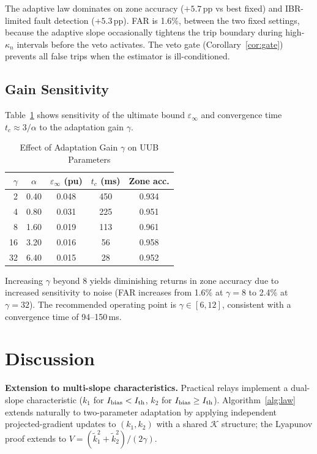 \documentclass[journal]{IEEEtran}
\newcommand{\kappan}{\kappa_{n}}
\newcommand{\ktilde}{\tilde{k}}
\newcommand{\Ibias}{I_{\rm bias}}
\newcommand{\calK}{\mathcal{K}}
\begin{document}
The adaptive law dominates on zone accuracy ($+5.7$\,pp vs best fixed)
and IBR-limited fault detection ($+5.3$\,pp).  FAR is 1.6\%, between
the two fixed settings, because the adaptive slope occasionally tightens
the trip boundary during high-$\kappan$ intervals before the veto
activates.  The veto gate (Corollary~\ref{cor:gate}) prevents all
false trips when the estimator is ill-conditioned.

\subsection{Gain Sensitivity}

Table~\ref{tab:gamma} shows sensitivity of the ultimate bound
$\varepsilon_\infty$ and convergence time $t_c \approx 3/\alpha$
to the adaptation gain $\gamma$.

\begin{table}[!t]
  \caption{Effect of Adaptation Gain $\gamma$ on UUB Parameters}
  \label{tab:gamma}
  \centering\small
  \begin{tabular}{@{}rcccc@{}}
    \toprule
    $\gamma$ & $\alpha$ & $\varepsilon_\infty$ (pu) & $t_c$ (ms) & Zone acc. \\
    \midrule
    2  & 0.40 & 0.048 & 450 & 0.934 \\
    4  & 0.80 & 0.031 & 225 & 0.951 \\
    8  & 1.60 & 0.019 & 113 & 0.961 \\
    16 & 3.20 & 0.016 &  56 & 0.958 \\
    32 & 6.40 & 0.015 &  28 & 0.952 \\
    \bottomrule
  \end{tabular}
\end{table}

Increasing $\gamma$ beyond 8 yields diminishing returns in zone accuracy
due to increased sensitivity to noise (FAR increases from 1.6\% at
$\gamma=8$ to 2.4\% at $\gamma=32$).  The recommended operating point
is $\gamma \in [6, 12]$, consistent with a convergence time of 94--150\,ms.

\section{Discussion}
\label{sec:disc}

\textbf{Extension to multi-slope characteristics.}
Practical relays implement a dual-slope characteristic
($k_1$ for $\Ibias < I_{\rm th}$, $k_2$ for $\Ibias \geq I_{\rm th}$).
Algorithm~\ref{alg:law} extends naturally to two-parameter adaptation
by applying independent projected-gradient updates to $(k_1, k_2)$
with a shared $\calK$ structure; the Lyapunov proof extends to
$V = (\ktilde_1^2 + \ktilde_2^2)/(2\gamma)$.
\end{document}
